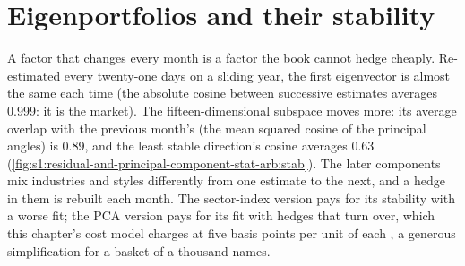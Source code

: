\begin{omfigure}

\label{fig:s1:residual-and-principal-component-stat-arb:path}
\end{omfigure}

\section{Eigenportfolios and their stability}

A factor that changes every month is a factor the book cannot hedge cheaply. Re-estimated every twenty-one days on a sliding year, the first eigenvector is
almost the same each time (the absolute cosine between successive estimates averages 0.999: it is the market). The fifteen-dimensional subspace moves more:
its average overlap with the previous month's (the mean squared cosine of the principal angles) is 0.89, and the least stable direction's cosine averages 0.63
(\cref{fig:s1:residual-and-principal-component-stat-arb:stab}). The later components mix industries and styles differently from one estimate to the next, and
a hedge in them is rebuilt each month. The sector-index version pays for its stability with a worse fit; the PCA version pays for its fit with hedges that turn
over, which this chapter's cost model charges at five basis points per unit of each , a generous simplification for a basket of a thousand
names.

